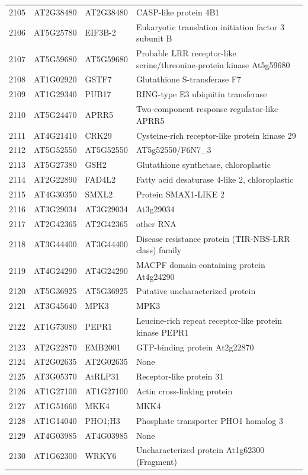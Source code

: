 \documentclass[11pt]{article}
\begin{document}
\begin{center}
\begin{tabular}{rlll}
2105 & AT2G38480 & AT2G38480 & CASP-like protein 4B1\\
2106 & AT5G25780 & EIF3B-2 & Eukaryotic translation initiation factor 3 subunit B\\
2107 & AT5G59680 & AT5G59680 & Probable LRR receptor-like serine/threonine-protein kinase At5g59680\\
2108 & AT1G02920 & GSTF7 & Glutathione S-transferase F7\\
2109 & AT1G29340 & PUB17 & RING-type E3 ubiquitin transferase\\
2110 & AT5G24470 & APRR5 & Two-component response regulator-like APRR5\\
2111 & AT4G21410 & CRK29 & Cysteine-rich receptor-like protein kinase 29\\
2112 & AT5G52550 & AT5G52550 & AT5g52550/F6N7\_3\\
2113 & AT5G27380 & GSH2 & Glutathione synthetase, chloroplastic\\
2114 & AT2G22890 & FAD4L2 & Fatty acid desaturase 4-like 2, chloroplastic\\
2115 & AT4G30350 & SMXL2 & Protein SMAX1-LIKE 2\\
2116 & AT3G29034 & AT3G29034 & At3g29034\\
2117 & AT2G42365 & AT2G42365 & other RNA\\
2118 & AT3G44400 & AT3G44400 & Disease resistance protein (TIR-NBS-LRR class) family\\
2119 & AT4G24290 & AT4G24290 & MACPF domain-containing protein At4g24290\\
2120 & AT5G36925 & AT5G36925 & Putative uncharacterized protein\\
2121 & AT3G45640 & MPK3 & MPK3\\
2122 & AT1G73080 & PEPR1 & Leucine-rich repeat receptor-like protein kinase PEPR1\\
2123 & AT2G22870 & EMB2001 & GTP-binding protein At2g22870\\
2124 & AT2G02635 & AT2G02635 & None\\
2125 & AT3G05370 & AtRLP31 & Receptor-like protein 31\\
2126 & AT1G27100 & AT1G27100 & Actin cross-linking protein\\
2127 & AT1G51660 & MKK4 & MKK4\\
2128 & AT1G14040 & PHO1;H3 & Phosphate transporter PHO1 homolog 3\\
2129 & AT4G03985 & AT4G03985 & None\\
2130 & AT1G62300 & WRKY6 & Uncharacterized protein At1g62300 (Fragment)\\

\end{tabular}
\end{center}
\end{document}
